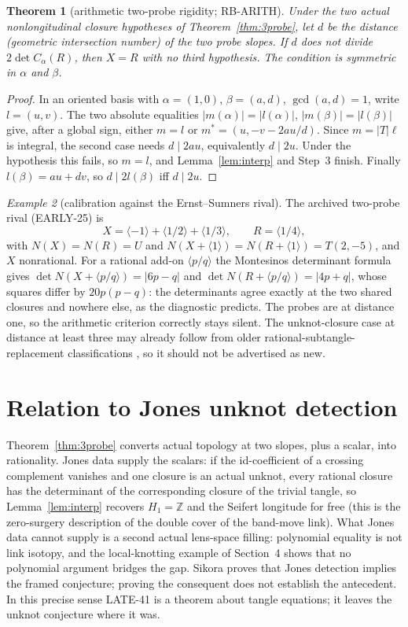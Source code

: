 \documentclass[11pt]{amsart}
\newtheorem{theorem}{Theorem}[section]
\theoremstyle{remark}
\newtheorem{example}[theorem]{Example}
\newcommand{\Z}{\mathbb{Z}}
\DeclareMathOperator{\dt}{det}
\begin{document}
\begin{theorem}[arithmetic two-probe rigidity; RB-ARITH]
Under the two actual nonlongitudinal closure hypotheses of Theorem~\ref{thm:3probe}, let $d$ be the distance (geometric intersection number) of the two probe slopes. If $d$ does not divide $2\dt C_\alpha(R)$, then $X=R$ with no third hypothesis. The condition is symmetric in $\alpha$ and $\beta$.
\end{theorem}

\begin{proof}
In an oriented basis with $\alpha=(1,0)$, $\beta=(a,d)$, $\gcd(a,d)=1$, write $l=(u,v)$. The two absolute equalities $|m(\alpha)|=|l(\alpha)|$, $|m(\beta)|=|l(\beta)|$ give, after a global sign, either $m=l$ or $m^*=(u,-v-2au/d)$. Since $m=|T|\ell$ is integral, the second case needs $d\mid 2au$, equivalently $d\mid 2u$. Under the hypothesis this fails, so $m=l$, and Lemma~\ref{lem:interp} and Step~3 finish. Finally $l(\beta)=au+dv$, so $d\mid 2l(\beta)$ iff $d\mid 2u$.
\end{proof}

\begin{example}[calibration against the Ernst--Sumners rival]
The archived two-probe rival (EARLY-25) is
\[
X=\langle -1\rangle+\langle 1/2\rangle+\langle 1/3\rangle,\qquad R=\langle 1/4\rangle,
\]
with $N(X)=N(R)=U$ and $N(X+\langle 1\rangle)=N(R+\langle 1\rangle)=T(2,-5)$, and $X$ nonrational. For a rational add-on $\langle p/q\rangle$ the Montesinos determinant formula gives $\dt N(X+\langle p/q\rangle)=|6p-q|$ and $\dt N(R+\langle p/q\rangle)=|4p+q|$, whose squares differ by $20p(p-q)$: the determinants agree exactly at the two shared closures and nowhere else, as the diagnostic predicts. The probes are at distance one, so the arithmetic criterion correctly stays silent. The unknot-closure case at distance at least three may already follow from older rational-subtangle-replacement classifications \cite{BakerBuck}, so it should not be advertised as new.
\end{example}

\section{Relation to Jones unknot detection}\label{sec:jones}

Theorem~\ref{thm:3probe} converts actual topology at two slopes, plus a scalar, into rationality. Jones data supply the scalars: if the id-coefficient of a crossing complement vanishes and one closure is an actual unknot, every rational closure has the determinant of the corresponding closure of the trivial tangle, so Lemma~\ref{lem:interp} recovers $H_1=\Z$ and the Seifert longitude for free (this is the zero-surgery description of the double cover of the band-move link). What Jones data cannot supply is a second actual lens-space filling: polynomial equality is not link isotopy, and the local-knotting example of Section~4 shows that no polynomial argument bridges the gap. Sikora proves that Jones detection implies the framed conjecture; proving the consequent does not establish the antecedent. In this precise sense LATE-41 is a theorem about tangle equations; it leaves the unknot conjecture where it was.
\end{document}
